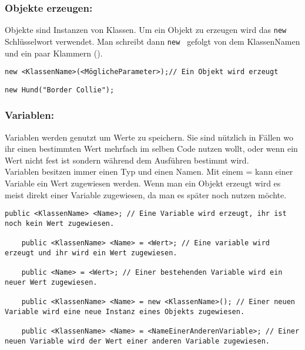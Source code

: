 \begin{Infobox}
	
	\subsubsection*{Objekte erzeugen:}
	Objekte sind Instanzen von Klassen.
	Um ein Objekt zu erzeugen wird das \lstinline{new} Schlüsselwort verwendet.
	Man schreibt dann \lstinline{new } gefolgt von dem KlassenNamen und ein paar Klammern ().
\end{Infobox}
\begin{lstlisting}[title=\textbf{Objekt erstellen Syntax}]
	new <KlassenName>(<MöglicheParameter>);// Ein Objekt wird erzeugt
\end{lstlisting}

\begin{lstlisting}[title=\textbf{Objekt erstellen Beispiel}]
	new Hund("Border Collie");
\end{lstlisting}
\begin{Infobox}
	\subsubsection*{Variablen:}
	Variablen werden genutzt um Werte zu speichern.
	Sie sind nützlich in Fällen wo ihr einen bestimmten Wert mehrfach im selben Code nutzen wollt, oder wenn ein Wert nicht fest ist sondern während dem Ausführen bestimmt wird.\\
	Variablen besitzen immer einen Typ und einen Namen.
	Mit einem = kann einer Variable ein Wert zugewiesen werden.
	Wenn man ein Objekt erzeugt wird es meist direkt einer Variable zugewiesen, da man es später noch nutzen möchte.
\end{Infobox}
\begin{lstlisting}[title=\textbf{Variablen Syntax}]
	public <KlassenName> <Name>; // Eine Variable wird erzeugt, ihr ist noch kein Wert zugewiesen.
	
	public <KlassenName> <Name> = <Wert>; // Eine variable wird erzeugt und ihr wird ein Wert zugewiesen.
	
	public <Name> = <Wert>; // Einer bestehenden Variable wird ein neuer Wert zugewiesen.
	
	public <KlassenName> <Name> = new <KlassenName>(); // Einer neuen Variable wird eine neue Instanz eines Objekts zugewiesen.
	
	public <KlassenName> <Name> = <NameEinerAnderenVariable>; // Einer neuen Variable wird der Wert einer anderen Variable zugewiesen. 
\end{lstlisting}
